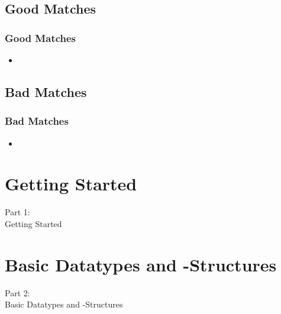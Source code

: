 \subsection{Good Matches}
\begin{frame}
    \frametitle{Good Matches}
    \vspace{5mm}
    
    \begin{itemize}
      \item 
    \end{itemize}
\end{frame}

\subsection{Bad Matches}
\begin{frame}
    \frametitle{Bad Matches}
    \vspace{5mm}
    
    \begin{itemize}
      \item 
    \end{itemize}
\end{frame}


\section{Getting Started}
\begin{frame}
    \vspace{25mm}
    \begin{center}
        \Huge{Part 1:\\Getting Started}
    \end{center}
\end{frame}


\section{Basic Datatypes and -Structures}
\begin{frame}
    \vspace{25mm}
    \begin{center}
        \Huge{Part 2:\\Basic Datatypes and -Structures}
    \end{center}
\end{frame}

